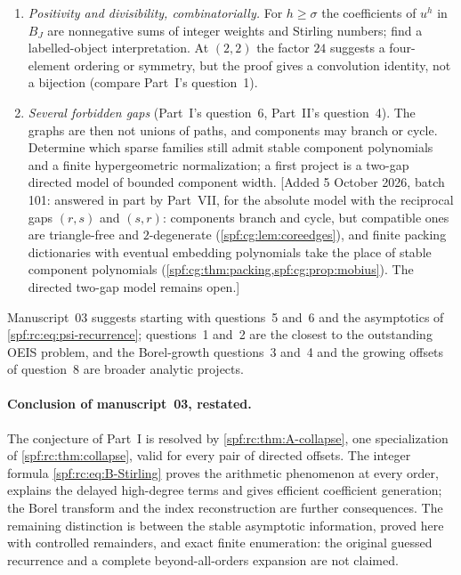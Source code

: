 \documentclass[11pt]{article}
\numberwithin{equation}{section}
\theoremstyle{definition}
\theoremstyle{remark}
\theoremstyle{definition}
\newcommand{\smallo}{\mathrm o}
\newcommand{\rcw}{\mathsf w}
\begin{document}
\begin{enumerate}
move. Find ranges such as $r+s=\smallo(\log n)$ with a uniform theorem, and
the crossovers where Poisson$(1)$ normalization fails; the exact mean
$(n-r)(n-s)/(n(n-1))$ constrains any scaling limit.
[Added 4 October 2026, batch 97: answered in local-density coordinates by
Part~IV: the expansion holds uniformly for all $1\le r,s\le n$ with the exact
parameter $\lambda_n=\theta(1-r/n)(1-s/n)$ in place of a Poisson$(1)$
normalization, the law tends to Poisson$(\theta(1-\alpha)(1-\beta))$ when
$r/n\to\alpha$ and $s/n\to\beta$ (\cref{spf:mg:cor:moving}), and the
corrections have kinks at $r/n=1/q$ (\cref{spf:mg:thm:boundary}). Part~IV's
coefficients are polynomials in local densities, not Part~III's integer
polynomials; how the degree law and the weight $\rcw_\sigma$ behave for
growing $\sigma$ remains open.]
\item \emph{Positivity and divisibility, combinatorially.} For $h\ge\sigma$
the coefficients of $u^h$ in $B_J$ are nonnegative sums of integer weights
and Stirling numbers; find a labelled-object interpretation. At $(2,2)$ the
factor $24$ suggests a four-element ordering or symmetry, but the proof
gives a convolution identity, not a bijection (compare Part~I's
question~1).
\item \emph{Several forbidden gaps} (Part~I's question~6, Part~II's
question~4). The graphs are then not unions of paths, and components may
branch or cycle. Determine which sparse families still admit stable
component polynomials and a finite hypergeometric normalization; a first
project is a two-gap directed model of bounded component width.
[Added 5 October 2026, batch 101: answered in part by Part~VII, for the
absolute model with the reciprocal gaps $(r,s)$ and $(s,r)$: components
branch and cycle, but compatible ones are triangle-free and $2$-degenerate
(\cref{spf:cg:lem:coreedges}), and finite packing dictionaries with eventual
embedding polynomials take the place of stable component polynomials
(\cref{spf:cg:thm:packing,spf:cg:prop:mobius}). The directed two-gap model
remains open.]
\end{enumerate}
Manuscript~03 suggests starting with questions~5 and~6 and the asymptotics of
\eqref{spf:rc:eq:psi-recurrence}; questions~1 and~2 are the closest to the
outstanding OEIS problem, and the Borel-growth questions~3 and~4 and the
growing offsets of question~8 are broader analytic projects.

\paragraph{Conclusion of manuscript~03, restated.} The conjecture of Part~I
is resolved by \cref{spf:rc:thm:A-collapse}, one specialization of
\cref{spf:rc:thm:collapse}, valid for every pair of directed offsets. The
integer formula \eqref{spf:rc:eq:B-Stirling} proves the arithmetic
phenomenon at every order, explains the delayed high-degree terms and gives
efficient coefficient generation; the Borel transform and the index
reconstruction are further consequences. The remaining distinction is
between the stable asymptotic information, proved here with controlled
remainders, and exact finite enumeration: the original guessed recurrence
and a complete beyond-all-orders expansion are not claimed.
\end{document}
